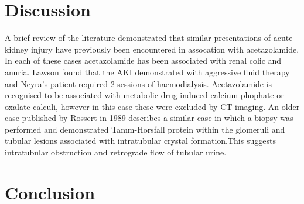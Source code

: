 \documentclass[11pt, ]{article}
\begin{document}
\section*{Discussion}
A brief review of the literature demonstrated that similar presentations of acute kidney injury have previously been encountered in assocation with acetazolamide\cite{Neyra2014, Rossert1984, Lawson2020}. In each of these cases acetazolamide has been associated with renal colic and anuria. Lawson found that the AKI demonstrated with aggressive fluid therapy and Neyra's patient required 2 sessions of haemodialysis. Acetazolamide is recognised to be associated with metabolic drug-induced calcium phophate or oxalate calculi, however in this case these were excluded by CT imaging. An older case published by Rossert in 1989 describes a similar case in which a biopsy was performed and demonstrated Tamm-Horsfall protein within the glomeruli and tubular lesions associated with intratubular crystal formation.This suggests intratubular obstruction and retrograde flow of tubular urine\cite{Rossert1984}.  

\section*{Conclusion}




\printbibliography
\end{document}

